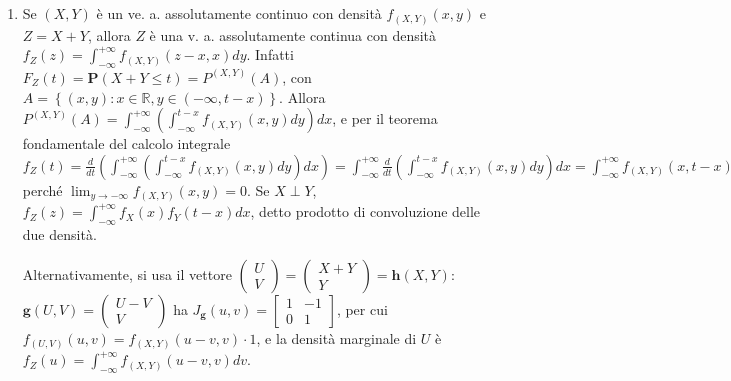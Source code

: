 \documentclass{article}
\begin{document}
\begin{enumerate}
\item Se $\left( X,Y\right) $ \`{e} un ve. a. assolutamente continuo con
densit\`{a} $f_{\left( X,Y\right) }\left( x,y\right) $ e $Z=X+Y$, allora $Z$ 
\`{e} una v. a. assolutamente continua con densit\`{a} $f_{Z}\left( z\right)
=\int_{-\infty }^{+\infty }f_{\left( X,Y\right) }\left( z-x,x\right) dy$.
Infatti $F_{Z}\left( t\right) =\mathbf{P}\left( X+Y\leq t\right) =P^{\left(
X,Y\right) }\left( A\right) $, con $A=\left\{ \left( x,y\right) :x\in 
\mathbb{R}
,y\in \left( -\infty ,t-x\right) \right\} $. Allora $P^{\left( X,Y\right)
}\left( A\right) =\int_{-\infty }^{+\infty }\left( \int_{-\infty
}^{t-x}f_{\left( X,Y\right) }\left( x,y\right) dy\right) dx$, e per il
teorema fondamentale del calcolo integrale $f_{Z}\left( t\right) =\frac{d}{dt%
}\left( \int_{-\infty }^{+\infty }\left( \int_{-\infty }^{t-x}f_{\left(
X,Y\right) }\left( x,y\right) dy\right) dx\right) =\int_{-\infty }^{+\infty }%
\frac{d}{dt}\left( \int_{-\infty }^{t-x}f_{\left( X,Y\right) }\left(
x,y\right) dy\right) dx=\int_{-\infty }^{+\infty }f_{\left( X,Y\right)
}\left( x,t-x\right) dx$ perch\'{e} $\lim_{y\rightarrow -\infty }f_{\left(
X,Y\right) }\left( x,y\right) =0$. Se $%
X\perp Y$, $f_{Z}\left( z\right) =\int_{-\infty }^{+\infty }f_{X}\left(
x\right) f_{Y}\left( t-x\right) dx$, detto prodotto di convoluzione delle
due densit\`{a}.

Alternativamente, si usa il vettore $\left( 
\begin{array}{c}
U \\ 
V%
\end{array}%
\right) =\left( 
\begin{array}{c}
X+Y \\ 
Y%
\end{array}%
\right) =\mathbf{h}\left( X,Y\right) $: $\mathbf{g}\left( U,V\right) =\left( 
\begin{array}{c}
U-V \\ 
V%
\end{array}%
\right) $ ha $J_{\mathbf{g}}\left( u,v\right) =\left[ 
\begin{array}{cc}
1 & -1 \\ 
0 & 1%
\end{array}%
\right] $, per cui $f_{\left( U,V\right) }\left( u,v\right) =f_{\left(
X,Y\right) }\left( u-v,v\right) \cdot 1$, e la densit\`{a} marginale di $U$ 
\`{e} $f_{Z}\left( u\right) =\int_{-\infty }^{+\infty }f_{\left( X,Y\right)
}\left( u-v,v\right) dv$.
\end{enumerate}
\end{document}
